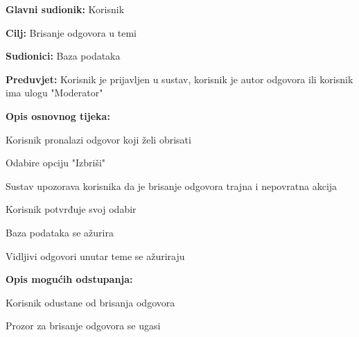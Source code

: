 					\noindent {}
					\begin{packed_item}
	
						\item \textbf{Glavni sudionik: }Korisnik
						\item  \textbf{Cilj:} Brisanje odgovora u temi
						\item  \textbf{Sudionici:} Baza podataka
						\item  \textbf{Preduvjet:} Korisnik je prijavljen u sustav, korisnik je autor odgovora ili korisnik ima ulogu "Moderator"
						\item  \textbf{Opis osnovnog tijeka:}
						
						\item[] \begin{packed_enum}
	
							\item Korisnik pronalazi odgovor koji želi obrisati
							\item Odabire opciju "Izbriši"
							\item Sustav upozorava korisnika da je brisanje odgovora trajna i nepovratna akcija
							\item Korisnik potvrđuje svoj odabir
							\item Baza podataka se ažurira
							\item Vidljivi odgovori unutar teme se ažuriraju
							
							
						\end{packed_enum}
						
						\item  \textbf{Opis mogućih odstupanja:}
						
						\item[] \begin{packed_item}
						\item[4.a] Korisnik odustane od brisanja odgovora
							\item[] \begin{packed_enum}
								
								\item Prozor za brisanje odgovora se ugasi
								
							\end{packed_enum}
						\end{packed_item}
						
						
					\end{packed_item}
					
